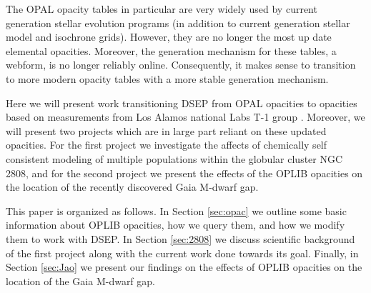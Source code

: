 The OPAL opacity tables in particular are very widely used by current
generation stellar evolution programs (in addition to current generation
stellar model and isochrone grids). However, they are no longer the most up
date elemental opacities. Moreover, the generation mechanism for these tables,
a webform, is no longer reliably online.  Consequently, it makes sense to
transition to more modern opacity tables with a more stable generation
mechanism.

Here we will present work transitioning DSEP from OPAL opacities to opacities
based on measurements from Los Alamos national Labs T-1 group
\citep[OPLIB][]{Colgan2016}. Moreover, we will present two projects which are
in large part reliant on these updated opacities. For the first project we
investigate the affects of chemically self consistent modeling of multiple
populations within the globular cluster NGC 2808, and for the second project we
present the effects of the OPLIB opacities on the location of the recently
discovered Gaia M-dwarf gap.

This paper is organized as follows. In Section \ref{sec:opac} we outline some
basic information about OPLIB opacities, how we query them, and how we modify
them to work with DSEP. In Section \ref{sec:2808} we discuss scientific
background of the first project along with the current work done towards its
goal. Finally, in Section \ref{sec:Jao} we present our findings on the effects
of OPLIB opacities on the location of the Gaia M-dwarf gap.





